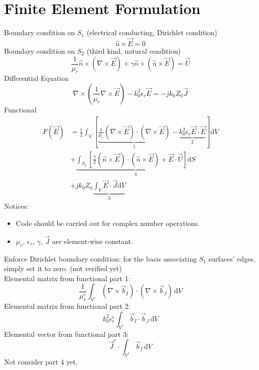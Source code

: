 \documentclass[a4paper,onecolumn]{article}
\begin{document}
\section{Finite Element Formulation}
Boundary condition on $S_1$ (electrical conducting, Dirichlet condition)
$$
    \hat{n} \times \vec{E} = 0
$$
Boundary condition on $S_2$ (third kind, natural condition)
$$
    \frac{1}{\mu_r} \hat{n} \times (\nabla \times \vec{E}) + \gamma \hat{n} \times (\hat{n}\times \vec{E}) = \vec{U}
$$
Differential Equation
$$
    \nabla\times \left(\frac{1}{\mu_r}\nabla\times \vec{E}\right)-k_0^2\epsilon_r\vec{E} = -jk_0Z_0\vec{J}
$$
Functional
\begin{equation*}\begin{split}
    F(\vec{E}) &= \frac{1}{2}\int_V \left[ \underbrace{\frac{1}{\mu_r} \left(\nabla\times \vec{E}\right)\cdot \left(\nabla\times\vec{E}\right)}_{1}-
                  \underbrace{k_0^2\epsilon_r \vec{E}\cdot \vec{E}}_{2}\right] \textrm{d}V\\
               &+ \underbrace{\int_{S_2} \left[ \frac{\gamma}{2} \left(\hat{n}\times \vec{E}\right)\cdot \left(\hat{n}\times \vec{E}\right)+\vec{E}\cdot \vec{U} \right] \textrm{d}S}_{4}\\
               &+ j k_0 Z_0 \underbrace{\int_V \vec{E}\cdot \vec{J}\textrm{d}V}_{3}
\end{split}\end{equation*}
Notices:
\begin{itemize}
    \item Code should be carried out for complex number operations.
    \item $\mu_r$, $\epsilon_r$, $\gamma$, $\vec{J}$ are element-wise constant.
\end{itemize}
Enforce Dirichlet boundary condition: for the basis associating $S_1$ surfaces' edges, simply set it to zero. (not verified yet)\\
Elemental matrix from functional part 1:
$$
    \frac{1}{\mu_r^e} \int_{V^e} \left(\nabla\times \vec{b}_I\right)\cdot \left(\nabla\times \vec{b}_J\right) \,\textrm{d}V
$$
Elemental matrix from functional part 2:
$$
    k_0^2 \epsilon_r^e \int_{V^e} \vec{b}_I\cdot\vec{b}_J \,\textrm{d}V
$$
Elemental vector from functional part 3:
$$
    \vec{J}^e \cdot \int_{V^e} \vec{b}_I \,\textrm{d}V
$$
Not consider part 4 yet.
\end{document}
